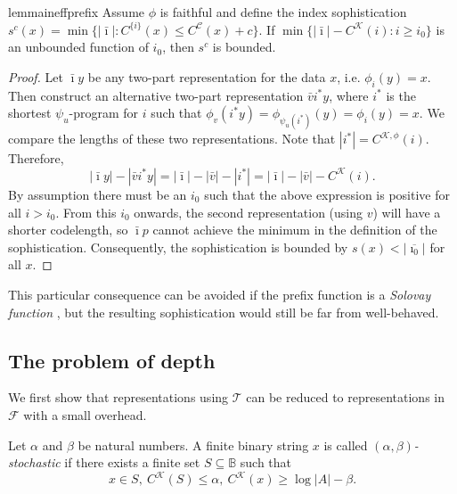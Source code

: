 \documentclass{style/llncs}
\newcommand{\C}{\mathscr C}
\newcommand{\T}{\mathscr T}
\newcommand{\F}{\mathscr F}
\newcommand{\K}{\mathscr K}
\newcommand{\B}{\mathbb B}
\begin{document}
\begin{restatable}{lemma}{ineffprefix}
Assume $\phi$ is faithful and define the index sophistication $s^c(x)=\min\{|\bar\imath|:C^{\{i\}}(x)\le C^{\C}(x)+c\}$.
If $\min\{|\bar\imath|-C^\K(i):i\ge i_0\}$ is an unbounded function of $i_0$, then $s^c$ is bounded.\label{lemma:prefix-inefficiency}
\end{restatable}
\begin{proof}
Let $\bar\imath y$ be any two-part representation for the data $x$, i.e. $\phi_i(y)=x$. Then construct an alternative two-part representation $\bar vi^* y$, where $i^*$ is the shortest $\psi_u$-program for $i$ such that $\phi_v(i^* y)=\phi_{\psi_u(i^*)}(y) = \phi_i(y)=x$. We compare the lengths of these two representations. Note that $|i^*|=C^{\K,\phi}(i)$. Therefore,
\[
|\bar\imath y|-|\bar v i^* y| = |\bar\imath|-|\bar v| - |i^*| = |\bar\imath|-|\bar v|-C^{\K}(i).
\]
By assumption there must be an $i_0$ such that the above expression is positive for all $i>i_0$. From this $i_0$ onwards, the second representation (using $v$) will have a shorter codelength, so $\bar\imath p$ cannot achieve the minimum in the definition of the sophistication. Consequently, the sophistication is bounded by $s(x)<|\overline{\imath_0}|$ for all $x$. 
\end{proof}
This particular consequence can be avoided if the prefix function is a \emph{Solovay function} \cite[Section~???]{downey2010algorithmic}, but the resulting sophistication would still be far from well-behaved. 

\subsection{The problem of depth}

We first show that representations using $\T$ can be reduced to representations in $\F$ with a small overhead.

\begin{definition}
  Let $\alpha$ and $\beta$ be natural numbers. A finite binary string $x$ is called \emph{$(\alpha,\beta)$-stochastic} if there exists a finite set $S\subseteq\B$ such that 
  \[
  x\in S,~C^\K(S)\le\alpha,~C^\K(x)\ge\log|A|-\beta.
\]
\end{definition}
\end{document}
